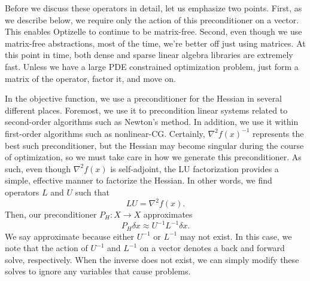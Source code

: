 \documentclass{report}
\begin{document}
        Before we discuss these operators in detail, let us emphasize two points.  First, as we describe below, we require only the action of this preconditioner on a vector.  This enables Optizelle to continue to be matrix-free.  Second, even though we use matrix-free abstractions, most of the time, we're better off just using matrices.  At this point in time, both dense and sparse linear algebra libraries are extremely fast.  Unless we have a large PDE constrained optimization problem, just form a matrix of the operator, factor it, and move on.
        
        In the objective function, we use a preconditioner for the Hessian in several different places.  Foremost, we use it to precondition linear systems related to second-order algorithms such as Newton's method.  In addition, we use it within first-order algorithms such as nonlinear-CG.  Certainly, $\nabla^2 f(x)^{-1}$ represents the best such preconditioner, but the Hessian may become singular during the course of optimization, so we must take care in how we generate this preconditioner.  As such, even though $\nabla^2 f(x)$ is self-adjoint, the LU factorization provides a simple, effective manner to factorize the Hessian.  In other words, we find operators $L$ and $U$ such that
$$
        LU=\nabla^2 f(x).
$$
Then, our preconditioner $P_H:X\rightarrow X$ approximates 
$$
        P_H\delta x \approx U^{-1}L^{-1} \delta x.
$$
We say approximate because either $U^{-1}$ or $L^{-1}$ may not exist.  In this case, we note that the action of $U^{-1}$ and $L^{-1}$ on a vector denotes a back and forward solve, respectively.  When the inverse does not exist, we can simply modify these solves to ignore any variables that cause problems.
\end{document}
